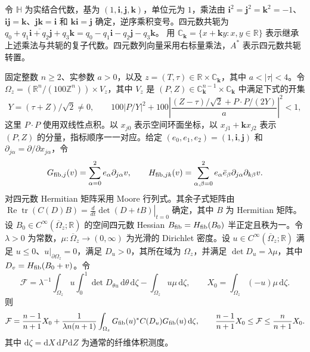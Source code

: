令 $\mathbb H$ 为实结合代数，基为 $(1,\mathbf i,\mathbf j,\mathbf k)$，单位元为 $1$，乘法由
$\mathbf i^2=\mathbf j^2=\mathbf k^2=-1$、$\mathbf i\mathbf j=\mathbf k$、$\mathbf j\mathbf k=\mathbf i$ 和 $\mathbf k\mathbf i=\mathbf j$ 确定，逆序乘积变号。四元数共轭为
$\overline{q_0+q_1\mathbf i+q_2\mathbf j+q_3\mathbf k}=q_0-q_1\mathbf i-q_2\mathbf j-q_3\mathbf k$。
用 $\mathbb C_{\mathbf k}=\{x+\mathbf k y:x,y\in\mathbb R\}$ 表示继承上述乘法与共轭的复子代数。四元数列向量采用右标量乘法，$A^*$ 表示四元数共轭转置。

固定整数 $n\ge2$、实参数 $a>0$，以及 $z=(T,\tau)\in\mathbb R\times\mathbb C_{\mathbf k}$，其中 $a<|\tau|<4$。令 $\Omega_z=(\mathbb R^n/(100\mathbb Z^n))\times V_z$，其中 $V_z$ 是 $(P,Z)\in\mathbb C_{\mathbf k}^{n-1}\times\mathbb C_{\mathbf k}$ 中满足下式的开集
\[
 Y=(\tau+Z)/\sqrt2\ne0,\qquad
 100\left|P/Y\right|^2+100\left|\frac{(Z-\tau)/\sqrt2+P\cdot P/(2Y)}{a}\right|^2<1,
\]
这里 $P\cdot P$ 使用双线性点积。以 $x_{j0}$ 表示空间环面坐标，以 $x_{j1}+\mathbf k x_{j2}$ 表示 $(P,Z)$ 的分量，指标顺序一一对应。给定 $(e_0,e_1,e_2)=(1,\mathbf i,\mathbf j)$ 和 $\partial_{j\alpha}=\partial/\partial x_{j\alpha}$，令
\[
G_{{\rm fib},j}(v)=\sum_{\alpha=0}^2e_\alpha\partial_{j\alpha}v,\qquad
H_{{\rm fib},jk}(v)=\sum_{\alpha,\beta=0}^2 e_\alpha\bar e_\beta
      \partial_{j\alpha}\partial_{k\beta}v .
\]
对四元数 Hermitian 矩阵采用 Moore 行列式。其余子式矩阵由
$\operatorname{Re}\operatorname{tr}(C(D)B)=\left.\frac{d}{dt}\det(D+tB)\right|_{t=0}$
确定，其中 $B$ 为 Hermitian 矩阵。设 $B_0\in C^\infty(\overline\Omega_z;\mathbb R)$ 的空间四元数 Hessian $B_{\rm fib}=H_{\rm fib}(B_0)$ 半正定且秩为一。令 $\lambda>0$ 为常数，$\mu:\overline\Omega_z\to(0,\infty)$ 为光滑的 Dirichlet 密度。设 $u\in C^\infty(\overline\Omega_z;\mathbb R)$ 满足 $u\le0$、$u|_{\partial\Omega_z}=0$，满足 $D_u>0$，其所在域为 $\Omega_z$，并满足 $\det D_u=\lambda\mu$，其中 $D_v=H_{\rm fib}(B_0+v)$。令
\[
 \mathcal F=\lambda^{-1}\int_{\Omega_z}u\int_0^1\det D_{\theta u}\,\mathrm d\theta\,\mathrm d\zeta
  -\int_{\Omega_z}u\mu\,\mathrm d\zeta,
 \qquad X_0=\int_{\Omega_z}(-u)\mu\,\mathrm d\zeta.
\]
则
\[
 \mathcal F=\frac{n-1}{n+1}X_0+\frac{1}{\lambda n(n+1)}
 \int_{\Omega_z} G_{\rm fib}(u)^* C(D_u)G_{\rm fib}(u)\,\mathrm d\zeta,
 \qquad
 \frac{n-1}{n+1}X_0\le\mathcal F\le\frac n{n+1}X_0.
\]
其中 $\mathrm d\zeta=\mathrm dX\,\mathrm dP\,\mathrm dZ$ 为通常的纤维体积测度。
